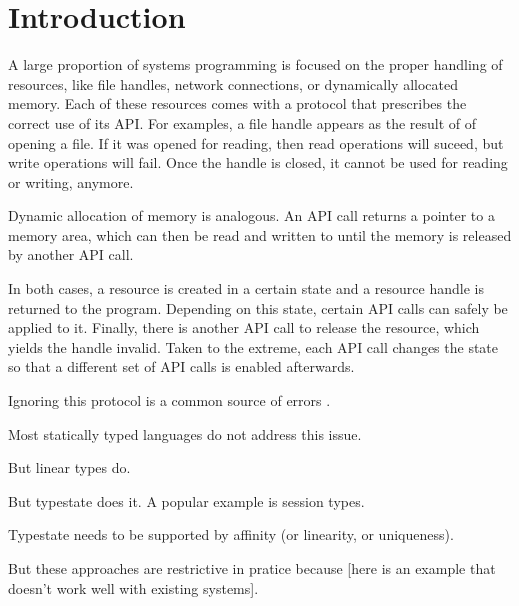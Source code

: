 \section{Introduction}

A large proportion of systems programming is focused on the proper
handling of resources, like file handles, network connections, or
dynamically allocated memory. Each of these resources comes with a
protocol that prescribes the correct use of its API.
For examples, a file handle appears as the result of of opening a
file. If it was opened for reading, then read operations will suceed,
but write operations will fail. Once the handle is closed, it cannot
be used for reading or writing, anymore.

Dynamic allocation of memory is analogous. An API call returns a
pointer to a memory area, which can then be read and written to until
the memory is released by another API call.

In both cases, a resource is created in a certain state and a resource
handle is returned to the program. Depending on this state, certain API calls
can safely be applied to it. Finally, there is another API call to
release the resource, which yields the handle invalid.
Taken to the extreme, each API call changes the state so that a
different set of API calls is enabled afterwards. 

Ignoring this protocol is a common source of errors
\cite{is-there-some-paper?}.

Most statically typed languages do not address this issue.

But linear types do.

But typestate does it. A popular example is session types.

Typestate needs to be supported by affinity (or linearity, or
uniqueness).

But these approaches are restrictive in pratice because [here is an
example that doesn't work well with existing systems].

